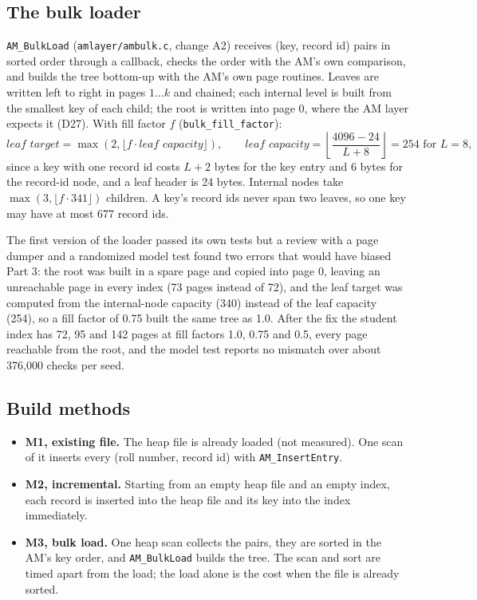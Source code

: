 \documentclass[11pt,a4paper]{article}
\begin{document}
\subsection{The bulk loader}

\texttt{AM\_BulkLoad} (\texttt{amlayer/ambulk.c}, change A2) receives (key, record id) pairs in sorted order through a callback, checks the order with the AM's own comparison, and builds the tree bottom-up with the AM's own page routines. Leaves are written left to right in pages \(1 \ldots k\) and chained; each internal level is built from the smallest key of each child; the root is written into page 0, where the AM layer expects it (D27). With fill factor \(f\) (\texttt{bulk\_fill\_factor}):
\[
\textit{leaf target} = \max\!\left(2, \lfloor f \cdot \textit{leaf capacity} \rfloor\right), \qquad
\textit{leaf capacity} = \left\lfloor \frac{4096 - 24}{L + 8} \right\rfloor = 254 \text{ for } L = 8,
\]
since a key with one record id costs \(L + 2\) bytes for the key entry and 6 bytes for the record-id node, and a leaf header is 24 bytes. Internal nodes take \(\max(3, \lfloor f \cdot 341 \rfloor)\) children. A key's record ids never span two leaves, so one key may have at most 677 record ids.

The first version of the loader passed its own tests but a review with a page dumper and a randomized model test found two errors that would have biased Part 3: the root was built in a spare page and copied into page 0, leaving an unreachable page in every index (73 pages instead of 72), and the leaf target was computed from the internal-node capacity (340) instead of the leaf capacity (254), so a fill factor of 0.75 built the same tree as 1.0. After the fix the student index has 72, 95 and 142 pages at fill factors 1.0, 0.75 and 0.5, every page reachable from the root, and the model test reports no mismatch over about 376{,}000 checks per seed.

\subsection{Build methods}

\begin{itemize}
\item \textbf{M1, existing file.} The heap file is already loaded (not measured). One scan of it inserts every (roll number, record id) with \texttt{AM\_InsertEntry}.
\item \textbf{M2, incremental.} Starting from an empty heap file and an empty index, each record is inserted into the heap file and its key into the index immediately.
\item \textbf{M3, bulk load.} One heap scan collects the pairs, they are sorted in the AM's key order, and \texttt{AM\_BulkLoad} builds the tree. The scan and sort are timed apart from the load; the load alone is the cost when the file is already sorted.
\end{itemize}
\end{document}
